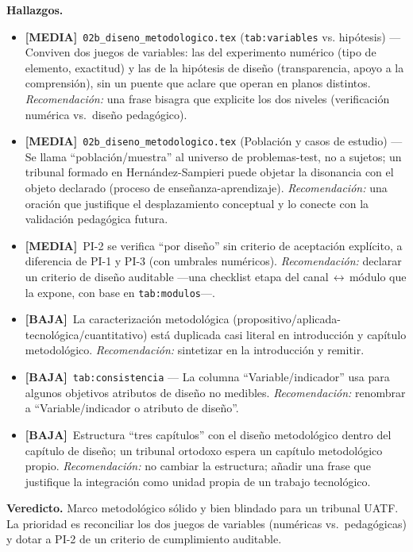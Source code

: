 \documentclass[11pt,a4paper]{article}
\newcommand{\sevmedia}{\textcolor{cMedia}{\textbf{[MEDIA]}}}
\newcommand{\sevbaja}{\textcolor{cBaja}{\textbf{[BAJA]}}}
\newcommand{\fileref}[1]{\texttt{\small #1}}
\begin{document}
\textbf{Hallazgos.}
\begin{itemize}
  \item \sevmedia\ \fileref{02b\_diseno\_metodologico.tex} (\fileref{tab:variables} vs. hipótesis) — Conviven dos juegos de variables: las del experimento numérico (tipo de elemento, exactitud) y las de la hipótesis de diseño (transparencia, apoyo a la comprensión), sin un puente que aclare que operan en planos distintos. \textit{Recomendación:} una frase bisagra que explicite los dos niveles (verificación numérica vs.\ diseño pedagógico).
  \item \sevmedia\ \fileref{02b\_diseno\_metodologico.tex} (Población y casos de estudio) — Se llama ``población/muestra'' al universo de problemas-test, no a sujetos; un tribunal formado en Hernández-Sampieri puede objetar la disonancia con el objeto declarado (proceso de enseñanza-aprendizaje). \textit{Recomendación:} una oración que justifique el desplazamiento conceptual y lo conecte con la validación pedagógica futura.
  \item \sevmedia\ PI-2 se verifica ``por diseño'' sin criterio de aceptación explícito, a diferencia de PI-1 y PI-3 (con umbrales numéricos). \textit{Recomendación:} declarar un criterio de diseño auditable —una checklist etapa del canal\,$\leftrightarrow$\,módulo que la expone, con base en \fileref{tab:modulos}—.
  \item \sevbaja\ La caracterización metodológica (propositivo/aplicada-tecnológica/cuantitativo) está duplicada casi literal en introducción y capítulo metodológico. \textit{Recomendación:} sintetizar en la introducción y remitir.
  \item \sevbaja\ \fileref{tab:consistencia} — La columna ``Variable/indicador'' usa para algunos objetivos atributos de diseño no medibles. \textit{Recomendación:} renombrar a ``Variable/indicador o atributo de diseño''.
  \item \sevbaja\ Estructura ``tres capítulos'' con el diseño metodológico dentro del capítulo de diseño; un tribunal ortodoxo espera un capítulo metodológico propio. \textit{Recomendación:} no cambiar la estructura; añadir una frase que justifique la integración como unidad propia de un trabajo tecnológico.
\end{itemize}

\textbf{Veredicto.} Marco metodológico sólido y bien blindado para un tribunal UATF. La prioridad es
reconciliar los dos juegos de variables (numéricas vs.\ pedagógicas) y dotar a PI-2 de un criterio de
cumplimiento auditable.
\end{document}
